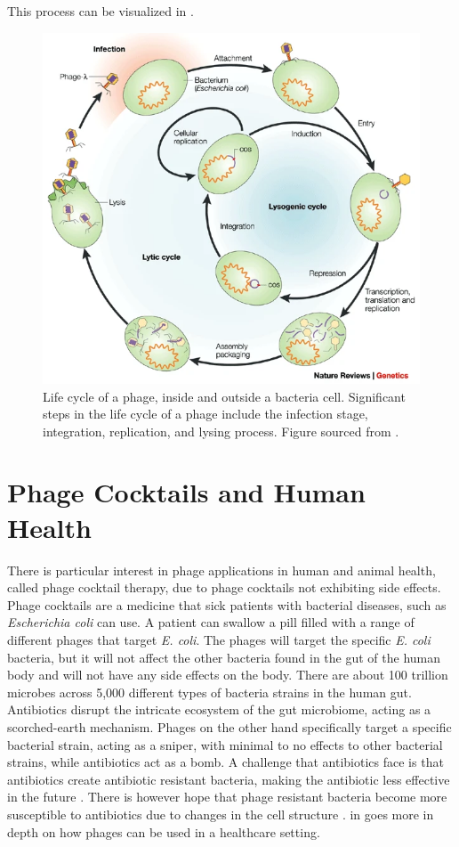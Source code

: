 This process can be visualized in .
\begin{figure}
    \centering
    \includegraphics[width=0.5\linewidth]{Figures/phage_life_cycle.png}
    \caption{Life cycle of a phage, inside and outside a bacteria cell. Significant steps in the life cycle of a phage include the infection stage, integration, replication, and lysing process. Figure sourced from \citet{campbellFutureBacteriophageBiology2003}. }
    \label{fig:phage_life_cycle}
\end{figure}

\section{Phage Cocktails and Human Health}
There is particular interest in phage applications in human and animal health, called phage cocktail therapy, due to phage cocktails not exhibiting side effects.
Phage cocktails are a medicine that sick patients with bacterial diseases, such as \textit{Escherichia coli} can use. 
A patient can swallow a pill filled with a range of different phages that target \textit{E. coli}.
The phages will target the specific \textit{E. coli} bacteria, but it will not affect the other bacteria found in the gut of the human body and will not have any side effects on the body. 
There are about 100 trillion microbes across 5,000 different types of bacteria strains in the human gut. 
Antibiotics disrupt the intricate ecosystem of the gut microbiome, acting as a scorched-earth mechanism. 
Phages on the other hand specifically target a specific bacterial strain, acting as a sniper, with minimal to no effects to other bacterial strains, while antibiotics act as a bomb. 
A challenge that antibiotics face is that antibiotics create antibiotic resistant bacteria, making the antibiotic less effective in the future \cite{odonkorBacteriaResistanceAntibiotics2011, volkovaEffectsEarlylifePenicillin2021}. 
There is however hope that phage resistant bacteria become more susceptible to antibiotics due to changes in the cell structure \cite{laurePhageResistancemediatedTradeoffs2022, zhaoPhagedrivenCoevolutionReveals2024}. 
 in  goes more in depth on how phages can be used in a healthcare setting. 

